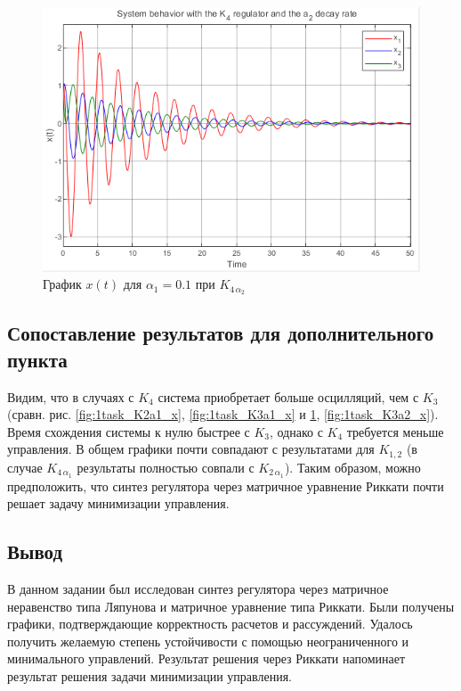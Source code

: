 \documentclass[a4paper, 12pt]{article}
\begin{document}
    \begin{figure}[H]
        \centering
        \includegraphics{1task_K4a2_x.png}
        \captionsetup{skip=0pt}
        \caption{График $x(t)$ для $\alpha_1=0.1$ при $K_{4\,\alpha_2}$}
        \label{fig:1task_K4a2_x}
    \end{figure}


    \subsection{Сопоставление результатов для дополнительного пункта}
    Видим, что в случаях с $K_4$ система приобретает больше осцилляций,
    чем с $K_3$ (сравн. рис. \ref{fig:1task_K2a1_x}, \ref{fig:1task_K3a1_x} и \ref{fig:1task_K4a2_x}, \ref{fig:1task_K3a2_x}).
    Время схождения системы к нулю быстрее с $K_3$, однако с $K_4$ требуется меньше управления. В общем графики
    почти совпадают с результатами для $K_{1,2}$ (в случае $K_{4\,\alpha_1}$ результаты полностью совпали с $K_{2\,\alpha_1}$). Таким образом,
    можно предположить, что синтез регулятора через матричное уравнение Риккати почти решает задачу минимизации управления.


    \subsection{Вывод}
    В данном задании был исследован синтез регулятора через матричное неравенство типа Ляпунова и
    матричное уравнение типа Риккати. Были получены графики, подтверждающие корректность расчетов и рассуждений.
    Удалось получить желаемую степень устойчивости с помощью неограниченного и минимального управлений. Результат решения через Риккати
    напоминает результат решения задачи минимизации управления.
\end{document}
